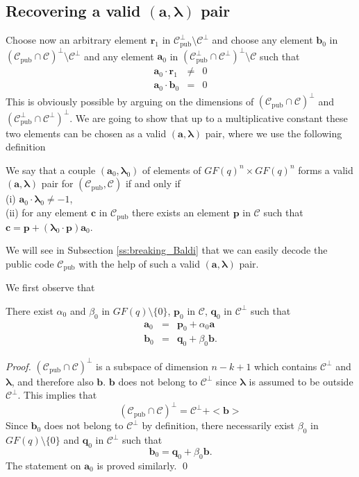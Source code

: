 \documentclass[runningheads,11pt]{llncs}
\newcommand{\code}[1]{\ensuremath{\mathscr{#1}}}
\newcommand{\Cpub}{\code{C}_{\text{pub}}}
\newcommand{\CC}{\code{C}}
\newcommand{\scp}[2]{#1\cdot #2}
\newcommand{\word}[1]{\ensuremath{\boldsymbol{#1}}}
\newcommand{\av}{\word{a}}
\newcommand{\bv}{\word{b}}
\newcommand{\lambdav}{\word{\lambda}}
\newcommand{\cv}{\word{c}}
\newcommand{\pv}{\word{p}}
\newcommand{\qv}{\word{q}}
\newcommand{\rv}{\word{r}}
\newcommand{\fq}{GF(q)}
\begin{document}
\subsection{Recovering a valid $(\av,\lambdav)$ pair}

Choose now an arbitrary element $\rv_1$ in $\Cpub^\perp \setminus \CC^\perp$ and 
choose  any element $\bv_0$ in $(\Cpub \cap \CC)^\perp \setminus \CC^\perp$ and any element
$\av_0$ in $(\Cpub^\perp \cap \CC^\perp)^\perp \setminus \CC$ such that
\begin{eqnarray}
\scp{\av_0}{\rv_1} & \neq & 0\\
\scp{\av_0}{\bv_0} & = & 0 \label{eq:av0bv0}
\end{eqnarray}
 This is obviously possible by arguing on the dimensions of $(\Cpub \cap \CC)^\perp$ and
 $(\Cpub^\perp \cap \CC^\perp)^\perp$.
 We are going to show that up to a multiplicative 
constant these two elements can be chosen as a valid $(\av,\lambdav)$ pair, where we use the following definition

\begin{definition}[valid $(\av,\lambdav)$ pair for $(\Cpub,\CC)$]
We say that a couple $(\av_0,\lambdav_0)$ of elements of $\fq^n\times \fq^n$ forms a 
valid $(\av,\lambdav)$ pair for $(\Cpub,\CC)$ if and only if \\
(i) $\scp{\av_0}{\lambdav_0} \neq -1$,\\
(ii) for any element $\cv$ in $\Cpub$ there
exists an element $\pv$ in $\CC$ such that $\cv = \pv + (\scp{\lambdav_0}{\pv}) \av_0$.
\end{definition}
We will see in Subsection \ref{ss:breaking_Baldi} that we can easily decode  the public code $\Cpub$ with the help of 
such a valid $(\av,\lambdav)$ pair.

We first observe that
\begin{lemma}
There exist $\alpha_0$ and $\beta_0$ in $\fq \setminus \{0\}$, $\pv_0$ in $\CC$, $\qv_0$ in $\CC^\perp$ such that
\begin{eqnarray}
\av_0 & = & \pv_0 + \alpha_0 \av\\
\bv_0 & = & \qv_0 + \beta_0 \bv.
\end{eqnarray}
\end{lemma}

\begin{proof}
$(\Cpub \cap \CC)^\perp$ is a subspace of dimension $n-k+1$ which contains $\CC^\perp$ and $\lambdav$, 
and therefore also $\bv$. $\bv$ does not belong to $\CC^\perp$ since $\lambdav$ is assumed to be outside
$\CC^\perp$. This implies that
\begin{equation}
\label{eq:base}
(\Cpub \cap \CC)^\perp = \CC^\perp + <\bv>
\end{equation}
Since $\bv_0$ does not belong to $\CC^\perp$ by definition, there necessarily exist 
$\beta_0$ in $\fq \setminus \{0\}$ and $\qv_0$ in $\CC^\perp$ such that
$$
\bv_0 = \qv_0 + \beta_0 \bv.
$$
The statement on $\av_0$ is proved similarly.
\qed
\end{proof}
\end{document}
